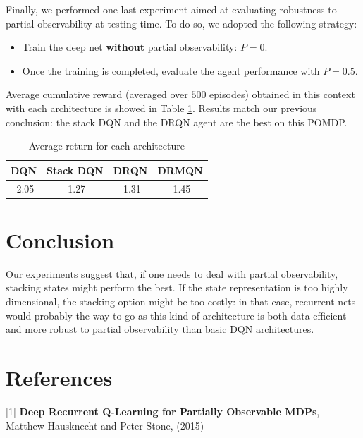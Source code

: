 \documentclass{article} %
\begin{document}
	Finally, we performed one last experiment aimed at evaluating robustness to partial observability at testing time. To do so, we adopted the following strategy:
	
	\begin{itemize}
		\item Train the deep net \textbf{without} partial observability: $P=0$. 
		\item Once the training is completed, evaluate the agent performance with $P=0.5$.
	\end{itemize}
	
	Average cumulative reward (averaged over $500$ episodes) obtained in this context with each architecture is showed in Table \ref{my-label}. Results match our previous conclusion: the stack DQN and the DRQN agent are the best on this POMDP.
	
	\begin{table}[!t]
		\centering
		\caption{Average return for each architecture}
		\label{my-label}
		\begin{tabular}{|c|c|c|c|}
			\hline
			DQN & Stack DQN & DRQN        & DRMQN       \\ \hline
			-2.05  & -1.27  & -1.31 & -1.45 \\ \hline
		\end{tabular}
	\end{table}
	
	\section{Conclusion}
	
	Our experiments suggest that, if one needs to deal with partial observability, stacking states might perform the best. If the state representation is too highly dimensional, the stacking option might be too costly: in that case, recurrent nets would probably the way to go as this kind of architecture is both data-efficient and more robust to partial observability than basic DQN architectures.
	
	\newpage
	
	\setcounter{secnumdepth}{0} %
	\section{References}
	\setcounter{secnumdepth}{1} %
		
	[1]  \textbf{Deep Recurrent Q-Learning for Partially Observable MDPs}, Matthew Hausknecht and Peter Stone, (2015) 
	\vspace{0.1cm}
	
\end{document}
